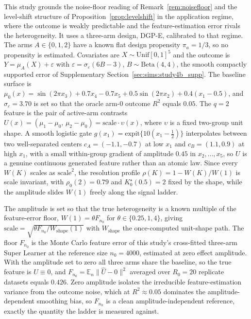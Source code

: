 \documentclass[11pt]{article}
\newcommand{\E}{\mathbb E}
\newcommand{\hU}{\widehat U}
\newcommand{\eps}{\varepsilon}
\begin{document}
This study grounds the noise-floor reading of Remark~\ref{rem:noisefloor} and the level-shift structure of Proposition~\ref{prop:levelshift} in the application regime, where the outcome is weakly predictable and the feature-estimation error rivals the heterogeneity. It uses a three-arm design, DGP-E, calibrated to that regime. The arms $A\in\{0,1,2\}$ have a known flat design propensity $\pi_a=1/3$, so no propensity is estimated. Covariates are $X\sim\mathrm{Unif}[0,1]^5$ and the outcome is $Y=\mu_A(X)+\eps$ with $\eps=\sigma_\eps(6B-3)$, $B\sim\mathrm{Beta}(4,4)$, the smooth compactly supported error of Supplementary Section~\ref{sec:sims:study4b_supp}. The baseline surface is $\mu_0(x)=\sin(2\pi x_3)+0.7x_4-0.7x_5+0.5\sin(2\pi x_2)+0.4(x_1-0.5)$, and $\sigma_\eps=3.70$ is set so that the oracle arm-$0$ outcome $R^2$ equals $0.05$. The $q=2$ feature is the pair of active-arm contrasts $U(x)=(\mu_1-\mu_0,\,\mu_2-\mu_0)=\mathrm{scale}\cdot\upsilon(x)$, where $\upsilon$ is a fixed two-group unit shape. A smooth logistic gate $g(x_1)=\mathrm{expit}\{10(x_1-\tfrac12)\}$ interpolates between two well-separated centers $c_A=(-1.1,-0.7)$ at low $x_1$ and $c_B=(1.1,0.9)$ at high $x_1$, with a small within-group gradient of amplitude $0.45$ in $x_2,\dots,x_5$, so $U$ is a genuine continuous generated feature rather than an atomic law. Since every $W(K)$ scales as $\mathrm{scale}^2$, the resolution profile $\rho(K)=1-W(K)/W(1)$ is scale invariant, with $\rho_0(2)=0.79$ and $K^\star_0(0.5)=2$ fixed by the shape, while the amplitude slides $W(1)$ freely along the signal ladder.

The amplitude is set so that the true heterogeneity is a known multiple of the feature-error floor, $W(1)=\theta F_{n_0}$ for $\theta\in\{0.25,1,4\}$, giving $\mathrm{scale}=\sqrt{\theta F_{n_0}/W_{\mathrm{shape}}(1)}$ with $W_{\mathrm{shape}}$ the once-computed unit-shape path. The floor $F_{n_0}$ is the Monte Carlo feature error of this study's cross-fitted three-arm Super Learner at the reference size $n_0=4000$, estimated at zero effect amplitude. With the amplitude set to zero all three arms share the baseline, so the true feature is $U\equiv0$, and $F_{n_0}=\E_n\|\hU-0\|^2$ averaged over $R_0=20$ replicate datasets equals $0.426$. Zero amplitude isolates the irreducible feature-estimation variance from the outcome noise, which at $R^2\approx0.05$ dominates the amplitude-dependent smoothing bias, so $F_{n_0}$ is a clean amplitude-independent reference, exactly the quantity the ladder is measured against.
\end{document}

